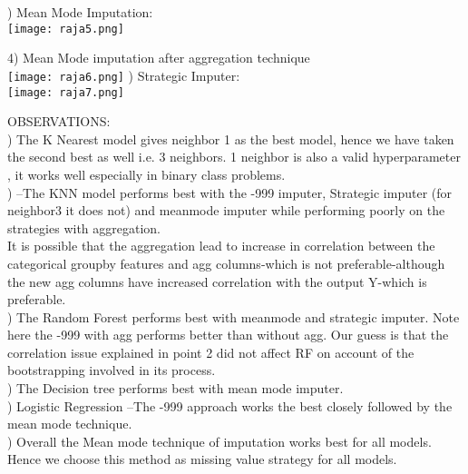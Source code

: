 \documentclass[fleqn,10pt]{SelfArx} %
\begin{document}
\begin{itemize}
)	Mean Mode Imputation:\\

\texttt{[image: raja5.png]}
\label{fig:results}

4)	Mean Mode imputation after aggregation technique\\

\texttt{[image: raja6.png]}
\label{fig:results}
)	Strategic Imputer:\\

\texttt{[image: raja7.png]}
\label{fig:results}

\noindent
OBSERVATIONS:\\

)	The K Nearest model gives neighbor 1 as the best model, hence we have taken the second best as well i.e. 3 neighbors. 1 neighbor is also a valid hyperparameter , it works well especially in binary class problems.\\

)	–The KNN model performs best with the -999 imputer, Strategic imputer (for neighbor3 it does not) and meanmode imputer while performing poorly on the strategies with aggregation.\\ It is possible that the aggregation lead to increase in correlation between the categorical groupby features and agg columns-which is not preferable-although the new agg columns have increased correlation with the output Y-which is preferable.\\

)	The Random Forest performs best with meanmode and strategic imputer. Note here the -999 with agg performs better than without agg. Our guess is that the correlation issue explained in point 2 did not affect RF on account of the bootstrapping involved in its process.\\

)	The Decision tree performs best with mean mode imputer.\\

)	Logistic Regression –The -999 approach works the best closely followed by the mean mode technique. \\

)	Overall the Mean mode technique of imputation works best for all models. Hence we choose this method as missing value strategy for all models.\\


\end{itemize}
\end{document}
